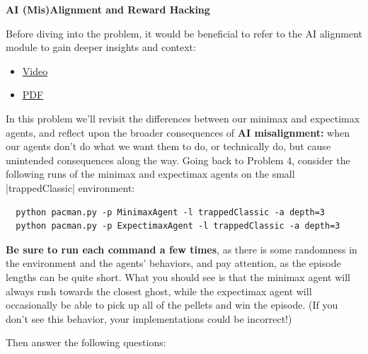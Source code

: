 \item {\bf AI (Mis)Alignment and Reward Hacking}


Before diving into the problem, it would be beneficial to refer to the AI alignment module to gain deeper insights and context:


\begin{itemize}
  \item \href{https://www.youtube.com/watch?v=5WHObJWE1FE&t=5s}{Video}
  \item \href{https://stanford-cs221.github.io/autumn2023-extra/modules/games/ai-alignment-problem.pdf}{PDF}
\end{itemize}


In this problem we'll revisit the differences between our minimax and expectimax agents, and 
reflect upon the broader consequences of \textbf{AI misalignment:} when our agents don't do what we want them to do, or
technically do, but cause unintended consequences along the way. Going back to Problem 4, consider the following runs of the
minimax and expectimax agents on the small
|trappedClassic| environment:

\begin{lstlisting}
  python pacman.py -p MinimaxAgent -l trappedClassic -a depth=3
  python pacman.py -p ExpectimaxAgent -l trappedClassic -a depth=3
\end{lstlisting}

\textbf{Be sure to run each command a few times}, as there is some
randomness in the environment and the agents' behaviors, and pay attention, as
the episode lengths can be quite short. What you should see is that the minimax
agent will always rush towards the closest ghost, while the expectimax agent
will occasionally be able to pick up all of the pellets and win the episode.
(If you don't see this behavior, your implementations could be incorrect!)

Then answer the following questions:


\begin{enumerate}

  

  

  
  
\end{enumerate}
